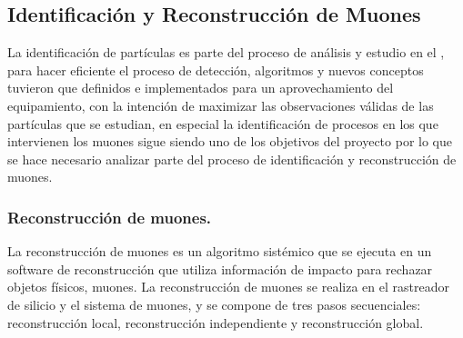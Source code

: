 \subsection{Identificación y Reconstrucción de Muones}

La identificación de partículas es parte del proceso de análisis y estudio en el \LHC, para hacer eficiente el proceso de detección, algoritmos y nuevos conceptos tuvieron que definidos e implementados para un aprovechamiento del equipamiento, con la intención de maximizar las observaciones válidas de las partículas que se estudian, en especial la identificación de procesos en los que intervienen los muones sigue siendo uno de los objetivos del proyecto por lo que se hace necesario analizar parte del proceso de identificación y reconstrucción de muones.

\subsubsection{Reconstrucción de muones.}
La reconstrucción de muones es un algoritmo sistémico que se ejecuta en un software de reconstrucción que utiliza información de impacto para rechazar objetos físicos, muones. La reconstrucción de muones se realiza en el rastreador de silicio y el sistema de muones, y se compone de tres pasos secuenciales: reconstrucción local, reconstrucción independiente y reconstrucción global. 


